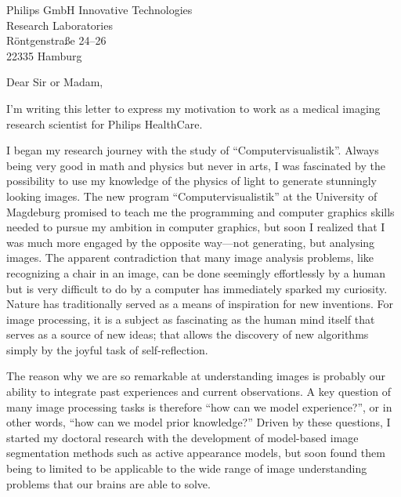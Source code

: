 \documentclass[version=last,
subject=titled,
firsthead=true,
fromalign=center,
fromrule=aftername,
locfield=wide,
firsthead=false,
parskip=half*
]{scrlttr2} %
\begin{document}
\begin{letter}{Philips GmbH Innovative Technologies\\
Research Laboratories\\
R\"ontgenstra\ss e 24--26\\
22335 Hamburg
}

\opening{Dear Sir or Madam,}


I'm writing this letter to express my motivation to work as a medical imaging
research scientist for Philips HealthCare.


I began my research journey with the study of ``Computervisualistik''. Always
being very good in math and physics but never in arts, I was fascinated by the
possibility to use my knowledge of the physics of light to generate stunningly
looking images. The new program ``Computervisualistik'' at the University of
Magdeburg promised to teach me the programming and computer graphics skills
needed to pursue my ambition in computer graphics, but soon I realized that I
was much more engaged by the opposite way---not generating, but analysing
images. The apparent contradiction that many image analysis problems, like
recognizing a chair in an image, can be done seemingly effortlessly by a human
but is very difficult to do by a computer has immediately sparked my curiosity.
Nature has traditionally served as a means of inspiration for new inventions.
For image processing, it is a subject as fascinating as the human mind itself
that serves as a source of new ideas; that allows the discovery of new
algorithms simply by the joyful task of self-reflection.

The reason why we are so remarkable at understanding images is probably our
ability to integrate past experiences and current observations. A key question
of many image processing tasks is therefore ``how can we model experience?'',
or in other words, ``how can we model prior knowledge?'' Driven by these
questions, I started my doctoral research with the development of model-based
image segmentation methods such as active appearance models, but soon found them
being to limited to be applicable to the wide range of image understanding
problems that our brains are able to solve.


\end{letter}
\end{document}
